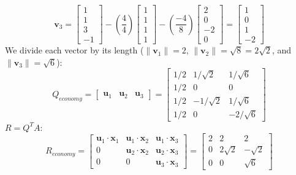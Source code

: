 \documentclass[../linear-algebra.tex]{subfiles}
\begin{document}
$$\mathbf{v}_3 = \begin{bmatrix} 1 \\ 1 \\ 3 \\ -1 \end{bmatrix} - \left( \frac{4}{4} \right) \begin{bmatrix} 1 \\ 1 \\ 1 \\ 1 \end{bmatrix} - \left( \frac{-4}{8} \right) \begin{bmatrix} 2 \\ 0 \\ -2 \\ 0 \end{bmatrix} = \begin{bmatrix} 1 \\ 0 \\ 1 \\ -2 \end{bmatrix}$$
We divide each vector by its length ($\|\mathbf{v}_1\| = 2$, $\|\mathbf{v}_2\| = \sqrt{8} = 2\sqrt{2}$, and $\|\mathbf{v}_3\| = \sqrt{6}$):
$$Q_{economy} = \begin{bmatrix} \mathbf{u}_1 & \mathbf{u}_2 & \mathbf{u}_3 \end{bmatrix} = \begin{bmatrix} 1/2 & 1/\sqrt{2} & 1/\sqrt{6} \\ 1/2 & 0 & 0 \\ 1/2 & -1/\sqrt{2} & 1/\sqrt{6} \\ 1/2 & 0 & -2/\sqrt{6} \end{bmatrix}$$
$R = Q^T A$:
$$R_{economy} = \begin{bmatrix} \mathbf{u}_1 \cdot \mathbf{x}_1 & \mathbf{u}_1 \cdot \mathbf{x}_2 & \mathbf{u}_1 \cdot \mathbf{x}_3 \\ 0 & \mathbf{u}_2 \cdot \mathbf{x}_2 & \mathbf{u}_2 \cdot \mathbf{x}_3 \\ 0 & 0 & \mathbf{u}_3 \cdot \mathbf{x}_3 \end{bmatrix} = \begin{bmatrix} 2 & 2 & 2 \\ 0 & 2\sqrt{2} & -\sqrt{2} \\ 0 & 0 & \sqrt{6} \end{bmatrix}$$
\end{document}
